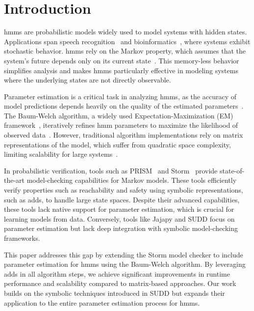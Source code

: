\section{Introduction}\label{sec:introduction}
\glspl{hmm} are probabilistic models widely used to model systems with hidden states. 
Applications span speech recognition~\cite{chavan2013overview} and bioinformatics~\cite{ciocchetta2009bio}, where systems exhibit stochastic behavior. 
\glspl{hmm} rely on the Markov property, which assumes that the system's future depends only on its current state~\cite{markov1962theory}. 
This memory-less behavior simplifies analysis and makes \glspl{hmm} particularly effective in modeling systems where the underlying states are not directly observable.

Parameter estimation is a critical task in analyzing \glspl{hmm}, as the accuracy of model predictions depends heavily on the quality of the estimated parameters~\cite{bacci2023mm}. 
The Baum-Welch algorithm, a widely used Expectation-Maximization (EM) framework~\cite{kenny2014deep}, iteratively refines \gls{hmm} parameters to maximize the likelihood of observed data~\cite{levinson1983introduction}. 
However, traditional algorithm implementations rely on matrix representations of the model, which suffer from quadratic space complexity, limiting scalability for large systems~\cite{davis2004comparing}.

In probabilistic verification, tools such as PRISM~\cite{kwiatkowska2011prism} and Storm~\cite{hensel2021probabilistic} provide state-of-the-art model-checking capabilities for Markov models. 
These tools efficiently verify properties such as reachability and safety using symbolic representations, such as \glspl{add}, to handle large state spaces. 
Despite their advanced capabilities, these tools lack native support for parameter estimation, which is crucial for learning models from data. 
Conversely, tools like Jajapy and SUDD focus on parameter estimation but lack deep integration with symbolic model-checking frameworks.

This paper addresses this gap by extending the Storm model checker to include parameter estimation for \glspl{hmm} using the Baum-Welch algorithm. 
By leveraging \glspl{add} in all algorithm steps, we achieve significant improvements in runtime performance and scalability compared to matrix-based approaches. 
Our work builds on the symbolic techniques introduced in SUDD but expands their application to the entire parameter estimation process for \glspl{hmm}. 

